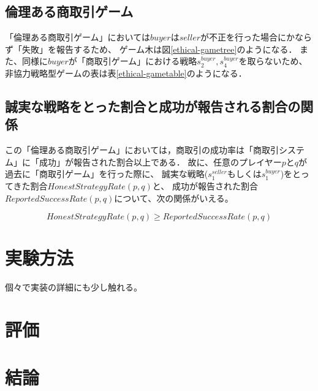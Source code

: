 \subsection{倫理ある商取引ゲーム}
「倫理ある商取引ゲーム」においては$buyer$は$seller$が不正を行った場合にかならず「失敗」を報告するため、
ゲーム木は図\ref{ethical-gametree}のようになる．
また、同様に$buyer$が「商取引ゲーム」における戦略$s^{buyer}_2, s^{buyer}_4$を取らないため、
非協力戦略型ゲームの表は表\ref{ethical-gametable}のようになる．

\subsection{誠実な戦略をとった割合と成功が報告される割合の関係}
この「倫理ある商取引ゲーム」においては，商取引の成功率は「商取引システム」に「成功」が報告された割合以上である．
故に、任意のプレイヤー$p$と$q$が過去に「商取引ゲーム」を行った際に、
誠実な戦略($s^{seller}_1$もしくは$s^{buyer}_1$)をとってきた割合$HonestStrategyRate(p, q)$と、
成功が報告された割合$ReportedSuccessRate(p, q)$について、次の関係がいえる。

\begin{equation}
  HonestStrategyRate(p, q) \geq ReportedSuccessRate(p, q)
\end{equation}




\section{実験方法}
個々で実装の詳細にも少し触れる。

\section{評価}

\section{結論}


\clearpage


% 

% 
% 
% 
% 